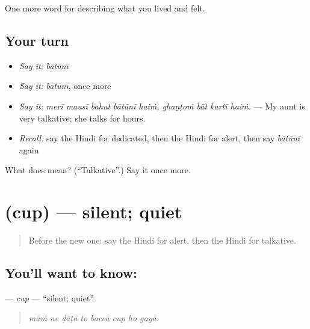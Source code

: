 \begin{grammarlens}[title={What you've built}]
One more word for describing what you lived and felt.
\end{grammarlens}

\subsection*{Your turn}
\begin{itemize}
\raggedright
  \item \emph{Say it:} \emph{bātūnī}
  \item \emph{Say it:} \emph{bātūnī}, once more
  \item \emph{Say it:} \emph{merī mausī bahut bātūnī haiṁ, ghaṇṭoṁ bāt kartī haiṁ.} — My aunt is very talkative; she talks for hours.
  \item \emph{Recall:} say the Hindi for dedicated, then the Hindi for alert, then say \emph{bātūnī} again
\end{itemize}

\begin{tcolorbox}[breakable,colback=teal!4,colframe=teal!35!black,title={Before you move on}]
What does  mean? (\textquotedblleft{}Talkative\textquotedblright{}.) Say it once more.
\end{tcolorbox}
\section[\texorpdfstring{\hi{चुप} (cup)}{चुप (cup)}]{ (cup) — silent; quiet}

\label{lesson:HI-C473-cup}



\begin{quote}
Before the new one: say the Hindi for alert, then the Hindi for talkative.
\end{quote}

\subsection*{You'll want to know: }
\textbf{} — \emph{cup} — \textquotedblleft{}silent; quiet\textquotedblright{}.

\begin{quote}
       
\end{quote}

\begin{quote}
\emph{māṁ ne ḍā̃ṭā to baccā cup ho gayā.}
\end{quote}

